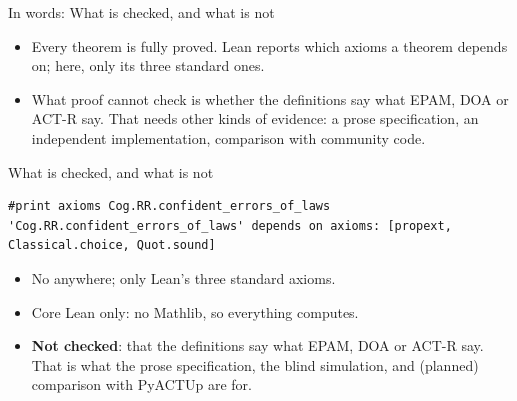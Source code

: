 \documentclass[aspectratio=169,11pt]{beamer}
\begin{document}
\begin{frame}{In words: What is checked, and what is not}
  \begin{itemize}
    \item Every theorem is fully proved. Lean reports which axioms a theorem depends on; here, only its three standard ones.
    \item What proof cannot check is whether the definitions say what EPAM, DOA or ACT-R say. That needs other kinds of evidence: a prose specification, an independent implementation, comparison with community code.
  \end{itemize}
\end{frame}


\begin{frame}[fragile]{What is checked, and what is not}
\begin{Verbatim}
#print axioms Cog.RR.confident_errors_of_laws
'Cog.RR.confident_errors_of_laws' depends on axioms: [propext, Classical.choice, Quot.sound]
\end{Verbatim}
  \medskip
  \begin{itemize}
    \item No  anywhere; only Lean's three standard axioms.
    \item Core Lean only: no Mathlib, so everything computes.
    \item \textbf{Not checked}: that the definitions say what EPAM, DOA or ACT-R say. That is what the prose specification, the blind simulation, and (planned) comparison with PyACTUp are for.
  \end{itemize}
\end{frame}
\end{document}
